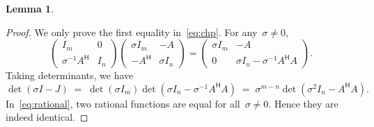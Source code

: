 \documentclass[11pt,a4paper]{article}  %
\numberwithin{equation}{section}
\newtheorem{lemma}{Lemma}%
\theoremstyle{definition}
\newcommand{\hmt}{{\scriptscriptstyle{{\mathsf{H}}}}}
\begin{document}
\begin{lemma}
\end{lemma}

\begin{proof}
  We only prove the first equality in~\eqref{eq:chp}. For any~$\sigma \neq 0$,
  \begin{equation*}
    \begin{pmatrix}
      I_m & 0 \\
      \sigma^{-1}A^\hmt & I_n
    \end{pmatrix}
    \begin{pmatrix}
      \sigma I_m & -A \\
      -A^\hmt & \sigma I_n
    \end{pmatrix}
    =
    \begin{pmatrix}
      \sigma I_m & -A\\
      0 & \sigma I_n - \sigma^{-1}A^\hmt A
    \end{pmatrix}.
  \end{equation*}
  Taking determinants, we have
  \begin{equation}
    \label{eq:rational}
    \det(\sigma I - J) \;=\; \det(\sigma I_m) \det(\sigma I_n - \sigma^{-1}A^\hmt A) \;=\;
    \sigma^{m-n} \det(\sigma^2 I_n -A^\hmt A).
  \end{equation}
  In~\eqref{eq:rational}, two rational functions are equal for all~$\sigma \neq 0$.
  Hence they are indeed identical.
\end{proof}
\end{document}

